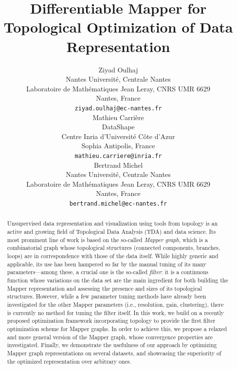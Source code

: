 \documentclass{article}
\title{Differentiable Mapper for Topological Optimization of Data Representation}
\author{ Ziyad Oulhaj\\
    Nantes Universit\'e, Centrale Nantes \\
    Laboratoire de Math\'ematiques Jean Leray, CNRS UMR 6629\\
	Nantes, France\\
	\texttt{ziyad.oulhaj@ec-nantes.fr} \\
	\And
	Mathieu Carrière \\
	DataShape\\
	Centre Inria d'Université Côte d'Azur\\
	Sophia Antipolis, France \\
	\texttt{mathieu.carriere@inria.fr} \\
    \And
	Bertrand Michel \\
    Nantes Universit\'e, Centrale Nantes \\
Laboratoire de Math\'ematiques Jean Leray, CNRS UMR 6629\\
	Nantes, France\\
	\texttt{bertrand.michel@ec-nantes.fr} \\
}
\date{}
\theoremstyle{plain}
\theoremstyle{definition}
\theoremstyle{remark}
\begin{document}
\maketitle

\begin{abstract}
Unsupervised data representation and visualization using tools from topology is an active and growing field 
of Topological Data Analysis (TDA) 
and data science.
Its most prominent line of work is based on the so-called {\em Mapper graph},
which is a combinatorial graph 
whose topological structures (connected components, branches, loops) are in correspondence with those of the data itself.
While highly generic and applicable, its use has been hampered so far by the manual tuning of its many
parameters---among these, a crucial
one is the so-called {\em filter}: it is a continuous function whose variations on the data set are the main
ingredient for both building the Mapper representation and assessing the presence and sizes of its topological structures.
However, while a few parameter tuning methods have already been investigated for the other Mapper parameters (i.e., resolution, gain, clustering), 
there is currently no method for tuning the filter itself. In this work, we build on a recently proposed 
optimization framework incorporating topology to provide the first filter optimization scheme for Mapper graphs.
In order to achieve this, we propose a relaxed and more general version of the Mapper graph, whose convergence
properties are investigated. Finally, we demonstrate the usefulness of our approach by optimizing Mapper 
graph representations on several datasets, and showcasing the superiority of the optimized representation over arbitrary ones.
\end{abstract}













\newpage



\newpage
\appendix







\end{document}
